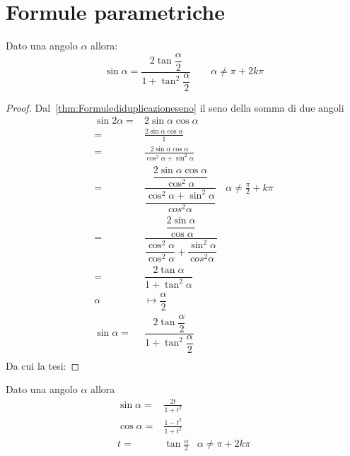 \section{Formule parametriche}
\begin{thm}\label{thm:senotangentemeta}
	Dato una angolo $\alpha$  allora:
\[\sin\alpha=\dfrac{2\tan\dfrac{\alpha}{2}}{1+\tan^2\dfrac{\alpha}{2}}\qquad\alpha\neq\pi+2k\pi \]
\end{thm}
\begin{proof}
	Dal~\vref{thm:Formulediduplicazioneseno} il seno della somma di due angoli 
	\begin{align*}
	\sin2\alpha=&2\sin\alpha\cos\alpha\\
	=&\frac{2\sin\alpha\cos\alpha}{1}\\
	=&\frac{2\sin\alpha\cos\alpha}{\cos^2\alpha+\sin^2\alpha}\\
	=&\dfrac{\dfrac{2\sin\alpha\cos\alpha}{\cos^2\alpha}}{\dfrac{\cos^2\alpha+\sin^2\alpha}{cos^2\alpha}}&\alpha\neq\frac{\pi}{2}+k\pi\\
	=&\dfrac{\dfrac{2\sin\alpha}{\cos\alpha}}{\dfrac{\cos^2\alpha}{\cos^2\alpha}+\dfrac{\sin^2\alpha}{cos^2\alpha}}\\
	=&\dfrac{2\tan\alpha}{1+\tan^2\alpha}\\
	\alpha&\longmapsto\dfrac{\alpha}{2}\\
	\sin\alpha=&\dfrac{2\tan\dfrac{\alpha}{2}}{1+\tan^2\dfrac{\alpha}{2}}\\
	\end{align*}
Da cui la tesi:
\end{proof}
\begin{thm}\label{thm:formuleparametriche1}
	Dato una angolo $\alpha$  allora
\begin{align*}
\sin\alpha=&\frac{2t}{1+t^2}\\
\cos\alpha=&\frac{1-t^2}{1+t^2}\\
t=&\tan\frac{\alpha}{2}&\alpha\neq\pi+2k\pi
\end{align*}
\end{thm}
